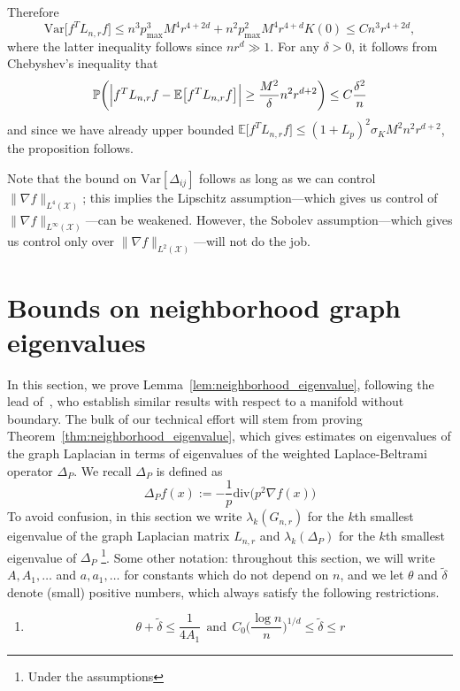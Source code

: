 \documentclass[twoside]{article}
\newcommand{\Var}{\mathrm{Var}}
\newcommand{\1}{\mathbf{1}}
\newcommand{\Lap}{L}
\newcommand{\Xset}{\mathcal{X}}
\newcommand{\Leb}{L}
\newcommand{\Pbb}{\mathbb{P}}
\newcommand{\Ebb}{\mathbb{E}}
\newcommand{\dive}{\mathrm{div}}
\newcommand{\wt}[1]{\widetilde{#1}}
\theoremstyle{definition}
\theoremstyle{remark}
\begin{document}
Therefore
\begin{equation*}
\Var\bigl[f^T \Lap_{n,r} f\bigr] \leq n^3 p_{\max}^3 M^4 r^{4 + 2d} + n^2 p_{\max}^2 M^4 r^{4 + d} K(0) \leq Cn^3r^{4 + 2d},
\end{equation*}
where the latter inequality follows since $nr^d \gg 1$. For any $\delta > 0$, it follows from Chebyshev's inequality that
\begin{equation*}
\Pbb\biggl(\Bigl|f^T \Lap_{n,r} f - \Ebb\bigl[f^T \Lap_{n,r} f\bigr]\Bigr| \geq \frac{M^2}{\delta}n^2 r^{d + 2}\biggr) \leq C\frac{\delta^2}{n}
\end{equation*}
and since we have already upper bounded $\Ebb\bigl[f^T \Lap_{n,r} f\bigr] \leq (1 + L_p)^2 \sigma_K M^2 n^2 r^{d + 2}$, the proposition follows. 

Note that the bound on $\Var[\varDelta_{i j}]$ follows as long as we can control $\|\nabla f\|_{\Leb^4(\Xset)}$; this implies the Lipschitz assumption---which gives us control of $\|\nabla f\|_{\Leb^{\infty}(\Xset)}$---can be weakened. However, the Sobolev assumption---which gives us control only over $\|\nabla f\|_{\Leb^2(\Xset)}$---will not do the job. 
\section{Bounds on neighborhood graph eigenvalues}
\label{sec:graph_eigenvalues}
In this section, we prove Lemma~\ref{lem:neighborhood_eigenvalue}, following the lead of~\citep{burago2014,trillos2019,calder2019}, who establish similar results with respect to a manifold without boundary. The bulk of our technical effort will stem from proving Theorem~\ref{thm:neighborhood_eigenvalue}, which gives estimates on eigenvalues of the graph Laplacian in terms of eigenvalues of the weighted Laplace-Beltrami operator $\Delta_P$. We recall $\Delta_P$ is defined as
\begin{equation*}
\Delta_Pf(x) := -\frac{1}{p} \dive\bigl(p^2\nabla f(x)\bigr)
\end{equation*}
To avoid confusion, in this section we write $\lambda_k(G_{n,r})$ for the $k$th smallest eigenvalue of the graph Laplacian matrix $\Lap_{n,r}$ and $\lambda_k(\Delta_P)$ for the $k$th smallest eigenvalue of $\Delta_P$ \footnote{Under the assumptions}. Some other notation: throughout this section, we will write $A, A_1,\ldots$ and $a,a_1,\ldots$ for constants which do not depend on $n$, and we let $\theta$ and $\wt{\delta}$ denote (small) positive numbers, which always satisfy the following restrictions.
\begin{enumerate}[label=(S\arabic*)]
	\item 
	\begin{equation*}
	\theta + \wt{\delta} \leq \frac{1}{4A_1}~~\textrm{and}~~C_0\biggl(\frac{\log n}{n}\biggr)^{1/d} \leq \wt{\delta} \leq r
	\end{equation*}
\end{enumerate}
\end{document}
